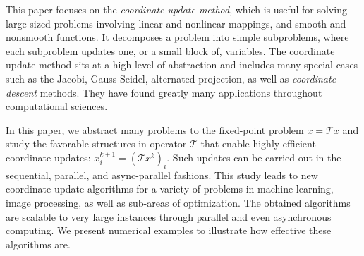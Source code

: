This paper focuses on the \emph{coordinate update method}, which is useful for solving large-sized problems involving linear and nonlinear mappings, and smooth and nonsmooth functions. It decomposes a problem into simple subproblems, where each subproblem updates one, or a small block of, variables. The coordinate update method sits at a high level of abstraction and includes many special cases such as the Jacobi, Gauss-Seidel, alternated projection, as well as \emph{coordinate descent} methods. They have found greatly many applications throughout computational sciences.

In this paper, we abstract many problems to the fixed-point problem $x=\mathcal{T} x$ and study the favorable structures in operator $\mathcal{T}$ that enable highly efficient coordinate updates: $x_i^{k+1} = (\mathcal{T} x^k)_i$. Such updates can be carried out in the sequential, parallel, and async-parallel fashions.  This study leads to new coordinate update algorithms for a variety of problems in machine learning, image processing, as well as sub-areas of optimization. The obtained algorithms are scalable to very large instances through parallel and even asynchronous computing. We present numerical examples to illustrate how effective these algorithms are.

